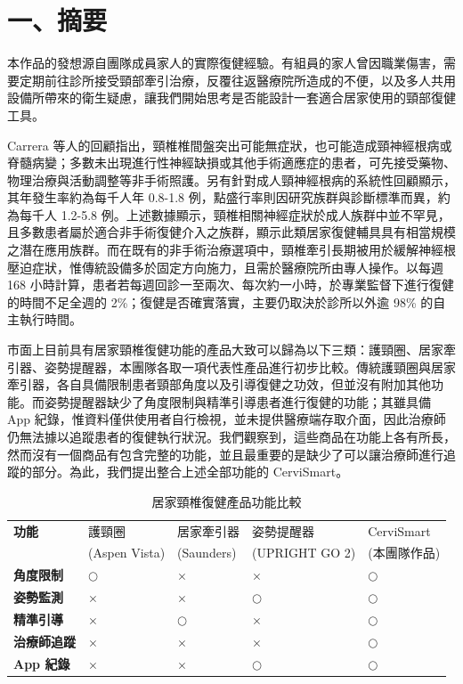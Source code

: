 \documentclass[12pt,a4paper]{article}
\newcommand{\yes}{\(\bigcirc\)}
\newcommand{\no}{\(\times\)}
\begin{document}
\section{一、摘要}

本作品的發想源自團隊成員家人的實際復健經驗。有組員的家人曾因職業傷害，需要定期前往診所接受頸部牽引治療，反覆往返醫療院所造成的不便，以及多人共用設備所帶來的衛生疑慮，讓我們開始思考是否能設計一套適合居家使用的頸部復健工具。

Carrera 等人的回顧指出，頸椎椎間盤突出可能無症狀，也可能造成頸神經根病或脊髓病變；多數未出現進行性神經缺損或其他手術適應症的患者，可先接受藥物、物理治療與活動調整等非手術照護\cite{carrera2026}。另有針對成人頸神經根病的系統性回顧顯示，其年發生率約為每千人年 0.8-1.8 例，點盛行率則因研究族群與診斷標準而異，約為每千人 1.2-5.8 例\cite{mansfield2020}。上述數據顯示，頸椎相關神經症狀於成人族群中並不罕見，且多數患者屬於適合非手術復健介入之族群，顯示此類居家復健輔具具有相當規模之潛在應用族群。而在既有的非手術治療選項中，頸椎牽引長期被用於緩解神經根壓迫症狀，惟傳統設備多於固定方向施力，且需於醫療院所由專人操作\cite{abi-aad2023}。以每週 168 小時計算，患者若每週回診一至兩次、每次約一小時，於專業監督下進行復健的時間不足全週的 2\%；復健是否確實落實，主要仍取決於診所以外逾 98\% 的自主執行時間。

市面上目前具有居家頸椎復健功能的產品大致可以歸為以下三類：護頸圈、居家牽引器、姿勢提醒器，本團隊各取一項代表性產品進行初步比較\cite{aspen-vista,saunders-traction,upright-go2}。傳統護頸圈與居家牽引器，各自具備限制患者頸部角度以及引導復健之功效，但並沒有附加其他功能。而姿勢提醒器缺少了角度限制與精準引導患者進行復健的功能；其雖具備 App 紀錄，惟資料僅供使用者自行檢視，並未提供醫療端存取介面，因此治療師仍無法據以追蹤患者的復健執行狀況。我們觀察到，這些商品在功能上各有所長，然而沒有一個商品有包含完整的功能，並且最重要的是缺少了可以讓治療師進行追蹤的部分。為此，我們提出整合上述全部功能的 CerviSmart。

\begin{table}[htbp]
    \centering
    \caption{居家頸椎復健產品功能比較}
    \label{tab:product-comparison}
    \renewcommand{\arraystretch}{1.25}
    \begin{tabularx}{\textwidth}{>{\bfseries}lYYYY}
        \toprule
        功能 & 護頸圈 & 居家牽引器 & 姿勢提醒器 & CerviSmart \\
             & \small (Aspen Vista) & \small (Saunders) & \small (UPRIGHT GO 2) & \small (本團隊作品) \\
        \midrule
        角度限制   & \yes & \no  & \no  & \yes \\
        姿勢監測   & \no  & \no  & \yes & \yes \\
        精準引導   & \no  & \yes & \no  & \yes \\
        治療師追蹤 & \no  & \no  & \no  & \yes \\
        App 紀錄   & \no  & \no  & \yes & \yes \\
        \bottomrule
    \end{tabularx}
\end{table}
\end{document}
